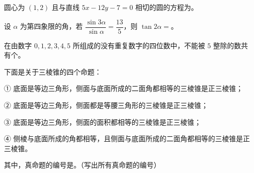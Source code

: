 \begin{question}
圆心为 $(1,2)$ 且与直线 $5x-12y-7=0$ 相切的圆的方程为\gkblank{}。

\end{question}
\begin{question}
设 $\alpha$ 为第四象限的角，若 $\dfrac{\sin3\alpha}{\sin\alpha}=\dfrac{13}{5}$，则 $\tan2\alpha=$\gkblank{}。

\end{question}
\begin{question}
在由数字 $0,1,2,3,4,5$ 所组成的没有重复数字的四位数中，不能被 $5$ 整除的数共有\gkblank{}个。

\end{question}
\begin{question}
下面是关于三棱锥的四个命题：

① 底面是等边三角形，侧面与底面所成的二面角都相等的三棱锥是正三棱锥；

② 底面是等边三角形，侧面都是等腰三角形的三棱锥是正三棱锥；

③ 底面是等边三角形，侧面的面积都相等的三棱锥是正三棱锥；

④ 侧棱与底面所成的角都相等，且侧面与底面所成的二面角都相等的三棱锥是正三棱锥。

其中，真命题的编号是\gkblank{}。（写出所有真命题的编号）

\end{question}

